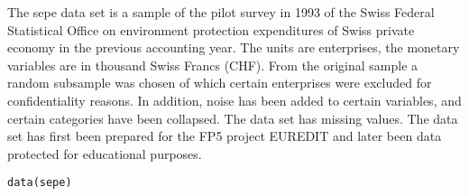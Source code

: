 %
\begin{Description}\relax
The sepe data set is a sample of the pilot survey  in 1993 of the Swiss Federal Statistical Office on environment protection expenditures of Swiss private economy in the previous accounting year. The units are enterprises, the monetary variables are in thousand Swiss Francs (CHF). From the original sample a random subsample was chosen of which certain enterprises were excluded for confidentiality reasons. In addition, noise has been added to certain variables, and certain categories have been collapsed. The data set has missing values. The data set has first been prepared for the FP5 project EUREDIT and later been data protected for educational purposes.  
\end{Description}
%
\begin{Usage}
\begin{verbatim}
data(sepe)
\end{verbatim}
\end{Usage}
%
